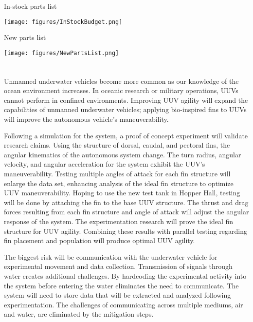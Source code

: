 \documentclass[]{IEEEtran}
\begin{document}
\begin{table*}[p]
\caption{In-stock parts list}
\label{tab:3}
\begin{center}
\texttt{[image: figures/InStockBudget.png]}
\end{center}
\end{table*}

\begin{table*}[p]
\caption{New parts list}
\label{tab:4}
\begin{center}
\texttt{[image: figures/NewPartsList.png]}
\end{center}
\end{table*}

\section{}
Unmanned underwater vehicles become more common as our knowledge of the ocean environment increases.  In oceanic research or military operations, UUVs cannot perform in confined environments.  Improving UUV agility will expand the capabilities of unmanned underwater vehicles; applying bio-inspired fins to UUVs will improve the autonomous vehicle’s maneuverability.  

Following a simulation for the system, a proof of concept experiment will validate research claims.  Using the structure of dorsal, caudal, and pectoral fins, the angular kinematics of the autonomous system change.  The turn radius, angular velocity, and angular acceleration for the system exhibit the UUV’s maneuverability.  Testing multiple angles of attack for each fin structure will enlarge the data set, enhancing analysis of the ideal fin structure to optimize UUV maneuverability.  Hoping to use the new test tank in Hopper Hall, testing will be done by attaching the fin to the base UUV structure.  The thrust and drag forces resulting from each fin structure and angle of attack will adjust the angular response of the system.  The experimentation research will prove the ideal fin structure for UUV agility.  Combining these results with parallel testing regarding fin placement and population will produce optimal UUV agility.   

The biggest risk will be communication with the underwater vehicle for experimental movement and data collection.  Transmission of signals through water creates additional challenges.  By hardcoding the experimental activity into the system before entering the water eliminates the need to communicate.  The system will need to store data that will be extracted and analyzed following experimentation.  The challenges of communicating across multiple mediums, air and water, are eliminated by the mitigation steps.  
\end{document}
